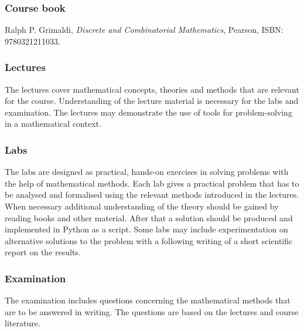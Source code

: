 \documentclass[10pt]{article}
\begin{document}
\subsubsection*{Course book}

Ralph P. Grimaldi,
\emph{Discrete and Combinatorial Mathematics},
Pearson, ISBN: 9780321211033.


\subsubsection*{Lectures}
The lectures cover mathematical concepts, theories and methods that
are relevant for the course. Understanding of the lecture material is
necessary for the labs and examination. The lectures may demonstrate
the use of tools for problem-solving in a mathematical context.

\subsubsection*{Labs}
The labs are designed as practical, hands-on exercises in solving
problems with the help of mathematical methods. Each lab gives a
practical problem that has to be analysed and formalised using the
relevant methods introduced in the lectures. When necessary additional
understanding of the theory should be gained by reading books and
other material. After that a solution should be produced and
implemented in Python as a script. Some labs may include
experimentation on alternative solutions to the problem with a
following writing of a short scientific report on the results.

\subsubsection*{Examination}
The examination includes questions concerning the mathematical methods
that are to be answered in writing. The questions are based on the
lectures and course literature.
\end{document}
